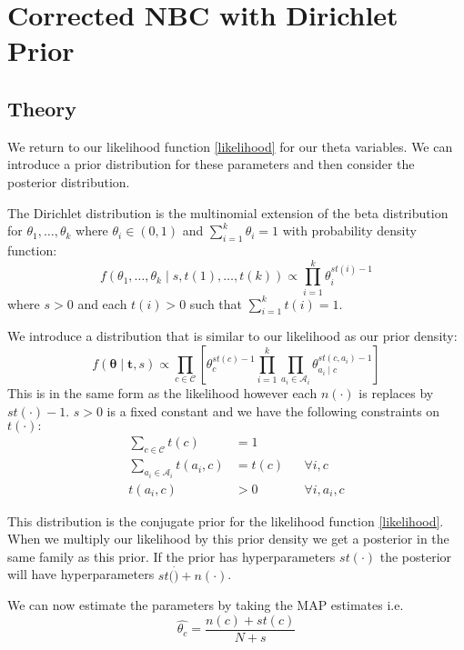 \chapter{Corrected NBC with Dirichlet Prior}

\section{Theory}

We return to our likelihood function \cref{likelihood} for our theta variables.
We can introduce a prior distribution for these parameters and then consider the posterior distribution.

The Dirichlet distribution is the multinomial extension of the beta distribution for $\theta_1,\dots,\theta_k$ where $\theta_i \in (0,1)$ and $\sum_{i=1}^k \theta_i = 1$ with probability density function:
\begin{equation} \label{dirichlet_pdf}
	f(\theta_1,\dots,\theta_k \mid s, t(1),\dots,t(k)) \propto \prod_{i=1}^k \theta_i^{st(i) - 1}
\end{equation}
where $s > 0$ and each $t(i)>0$ such that $\sum_{i=1}^{k}t(i) = 1$.

We introduce a distribution that is similar to our likelihood as our prior density:
\begin{equation} \label{prior}
	f(\mathbf{\theta} \mid \mathbf{t}, s) \propto \prod_{c \in \mathcal{C}} \left[ \theta_c^{st(c) - 1} \prod_{i=1}^k \prod_{a_i \in \mathcal{A}_i} \theta_{a_i \mid c}^{st(c, a_i) - 1} \right]
\end{equation}
This is in the same form as the likelihood however each $n(\cdot)$ is replaces by $st(\cdot) - 1$.
$s > 0$ is a fixed constant and we have the following constraints on $t(\cdot):$
\begin{align}\label{prior_constraints}
	\sum_{c \in \mathcal{C}} t(c) & = 1 \\
	\sum_{a_i \in \mathcal{A}_i} t(a_i, c) & = t(c) && \forall i, c \\
	t(a_i, c) & > 0 && \forall i, a_i, c
\end{align}

This distribution is the conjugate prior for the likelihood function \cref{likelihood}.
When we multiply our likelihood by this prior density we get a posterior in the same family as this prior.
If the prior has hyperparameters $st(\cdot)$ the posterior will have hyperparameters $st(\dot) + n(\cdot)$.

We can now estimate the parameters by taking the MAP estimates i.e.
\begin{equation}
	\hat{\theta_c} = \frac{n(c) + st(c)}{N + s}
\end{equation}

